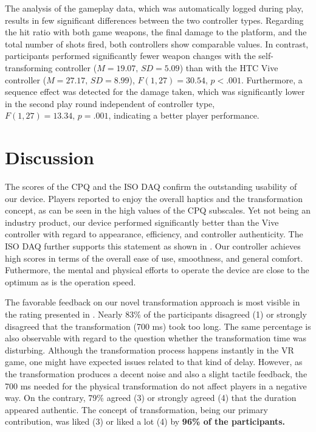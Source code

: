 \documentclass{sigchi}
\begin{document}
The analysis of the gameplay data, which was automatically logged during play, results in few significant differences between the two controller types. Regarding the hit ratio with both game weapons, the final damage to the platform, and the total number of shots fired, both controllers show comparable values. In contrast, participants performed significantly fewer weapon changes with the self-transforming controller ($M = 19.07,\,SD = 5.09$) than with the HTC Vive controller ($M = 27.17,\,SD = 8.99$), $F(1, 27) = 30.54,\,p < .001$. Furthermore, a sequence effect was detected for the damage taken, which was significantly lower in the second play round independent of controller type, $F(1, 27) = 13.34,\,p = .001$, indicating a better player performance.





\section{Discussion}


The scores of the CPQ and the ISO DAQ confirm the outstanding usability of our device. Players reported to enjoy the overall haptics and the transformation concept, as can be seen in the high values of the CPQ subscales. Yet not being an industry product, our device performed significantly better than the Vive controller with regard to appearance, efficiency, and controller authenticity. The ISO DAQ further supports this statement as shown in . Our controller achieves high scores in terms of the overall ease of use, smoothness, and general comfort. Futhermore, the mental and physical efforts to operate the device are close to the optimum as is the operation speed.

The favorable feedback on our novel transformation approach is most visible in the rating presented in . Nearly 83\% of the participants disagreed (1) or strongly disagreed that the transformation (700 ms) took too long. The same percentage is also observable with regard to the question whether the transformation time was disturbing. Although the transformation process happens instantly in the VR game, one might have expected issues related to that kind of delay. However, as the transformation produces a decent noise and also a slight tactile feedback, the 700 ms needed for the physical transformation do not affect players in a negative way. On the contrary, 79\% agreed (3) or strongly agreed (4) that the duration appeared authentic. The concept of transformation, being our primary contribution, was liked (3) or liked a lot (4) by \textbf{96\% of the participants.}
\end{document}
